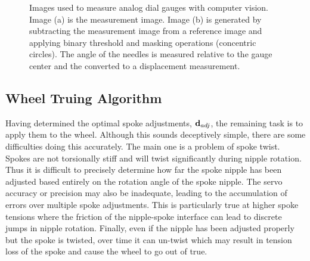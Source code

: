 \documentclass[journal]{IEEEtran}
\begin{document}
\begin{figure}[!t]
    \centering
    \quad
    \caption{Images used to measure analog dial gauges with computer vision. Image (a) is the measurement image.  Image (b) is generated by subtracting the measurement image from a reference image and applying binary threshold and masking operations (concentric circles). The angle of the needles is measured relative to the gauge center and the converted to a displacement measurement.}
    \label{fig:cv_img}
\end{figure}


\subsection{Wheel Truing Algorithm}
Having determined the optimal spoke adjustments, ${\bf d}_{adj}$, the remaining task is to apply them to the wheel. Although this sounds deceptively simple, there are some difficulties doing this accurately.  The main one is a problem of spoke twist. Spokes are not torsionally stiff and will twist significantly during nipple rotation.  Thus it is difficult to precisely determine how far the spoke nipple has been adjusted based entirely on the rotation angle of the spoke nipple. The servo accuracy or precision may also be inadequate, leading to the accumulation of errors over multiple spoke adjustments. This is particularly true at higher spoke tensions where the friction of the nipple-spoke interface can lead to discrete jumps in nipple rotation. Finally, even if the nipple has been adjusted properly but the spoke is twisted, over time it can un-twist which may result in tension loss of the spoke and cause the wheel to go out of true. 
\end{document}
